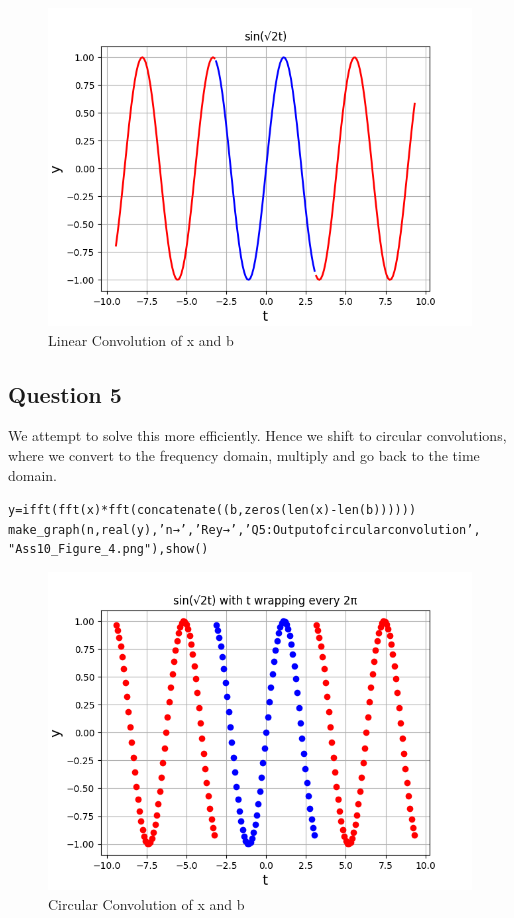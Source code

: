 \documentclass{article}
\begin{document}
\begin{figure}[h!]
\centering
\includegraphics[scale=0.6]{Figure_2.png}
\caption{Linear Convolution of x and b}
\label{fig:universe}
\end{figure}
\clearpage

\subsection{Question 5}
We attempt to solve this more efficiently. Hence we shift to circular convolutions, where we convert to the frequency domain, multiply and go back to the time domain.
\begin{alltt}
y = ifft(fft(x)*fft(concatenate((b, zeros(len(x) - len(b))))))
make_graph(n, real(y), 'n →', 'Re{y} →', 'Q5: Output of circular convolution', 
"Ass10_Figure_4.png"), show()
\end{alltt}
\begin{figure}[h!]
\centering
\includegraphics[scale=0.6]{Figure_3.png}
\caption{Circular Convolution of x and b}
\label{fig:universe}
\end{figure}
\end{document}

